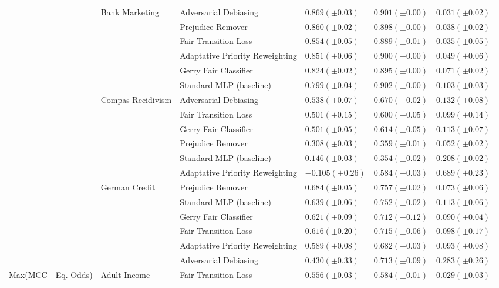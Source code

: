 \begin{tabular}{llllll}
\cline{2-6}
 & \multirow[t]{6}{*}{Bank Marketing} & Adversarial Debiasing & $0.869 (\pm0.03)$ & $0.901 (\pm0.00)$ & $0.031 (\pm0.02)$ \\
 &  & Prejudice Remover & $0.860 (\pm0.02)$ & $0.898 (\pm0.00)$ & $0.038 (\pm0.02)$ \\
 &  & Fair Transition Loss & $0.854 (\pm0.05)$ & $0.889 (\pm0.01)$ & $0.035 (\pm0.05)$ \\
 &  & Adaptative Priority Reweighting & $0.851 (\pm0.06)$ & $0.900 (\pm0.00)$ & $0.049 (\pm0.06)$ \\
 &  & Gerry Fair Classifier & $0.824 (\pm0.02)$ & $0.895 (\pm0.00)$ & $0.071 (\pm0.02)$ \\
 &  & Standard MLP (baseline) & $0.799 (\pm0.04)$ & $0.902 (\pm0.00)$ & $0.103 (\pm0.03)$ \\
\cline{2-6}
 & \multirow[t]{6}{*}{Compas Recidivism} & Adversarial Debiasing & $0.538 (\pm0.07)$ & $0.670 (\pm0.02)$ & $0.132 (\pm0.08)$ \\
 &  & Fair Transition Loss & $0.501 (\pm0.15)$ & $0.600 (\pm0.05)$ & $0.099 (\pm0.14)$ \\
 &  & Gerry Fair Classifier & $0.501 (\pm0.05)$ & $0.614 (\pm0.05)$ & $0.113 (\pm0.07)$ \\
 &  & Prejudice Remover & $0.308 (\pm0.03)$ & $0.359 (\pm0.01)$ & $0.052 (\pm0.02)$ \\
 &  & Standard MLP (baseline) & $0.146 (\pm0.03)$ & $0.354 (\pm0.02)$ & $0.208 (\pm0.02)$ \\
 &  & Adaptative Priority Reweighting & $-0.105 (\pm0.26)$ & $0.584 (\pm0.03)$ & $0.689 (\pm0.23)$ \\
\cline{2-6}
 & \multirow[t]{6}{*}{German Credit} & Prejudice Remover & $0.684 (\pm0.05)$ & $0.757 (\pm0.02)$ & $0.073 (\pm0.06)$ \\
 &  & Standard MLP (baseline) & $0.639 (\pm0.06)$ & $0.752 (\pm0.02)$ & $0.113 (\pm0.06)$ \\
 &  & Gerry Fair Classifier & $0.621 (\pm0.09)$ & $0.712 (\pm0.12)$ & $0.090 (\pm0.04)$ \\
 &  & Fair Transition Loss & $0.616 (\pm0.20)$ & $0.715 (\pm0.06)$ & $0.098 (\pm0.17)$ \\
 &  & Adaptative Priority Reweighting & $0.589 (\pm0.08)$ & $0.682 (\pm0.03)$ & $0.093 (\pm0.08)$ \\
 &  & Adversarial Debiasing & $0.430 (\pm0.33)$ & $0.713 (\pm0.09)$ & $0.283 (\pm0.26)$ \\
\cline{1-6} \cline{2-6}
\multirow[t]{24}{*}{Max(MCC - Eq. Odds)} & \multirow[t]{6}{*}{Adult Income} & Fair Transition Loss & $0.556 (\pm0.03)$ & $0.584 (\pm0.01)$ & $0.029 (\pm0.03)$ \\

\end{tabular}
